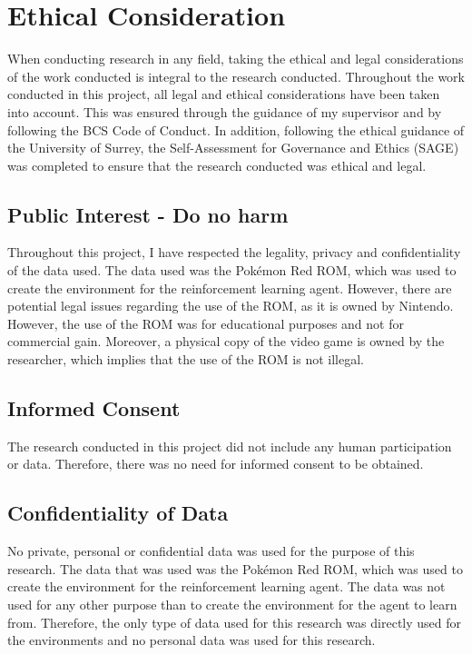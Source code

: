 \section{Ethical Consideration}

When conducting research in any field, taking the ethical and legal considerations of the work conducted is integral to the research conducted. Throughout the work conducted in this project, all legal and ethical considerations have been taken into account. This was ensured through the guidance of my supervisor and by following the BCS Code of Conduct. In addition, following the ethical guidance of the University of Surrey, the Self-Assessment for Governance and Ethics (SAGE) was completed to ensure that the research conducted was ethical and legal.


\subsection{Public Interest - Do no harm}

Throughout this project, I have respected the legality, privacy and confidentiality of the data used. The data used was the Pokémon Red ROM, which was used to create the environment for the reinforcement learning agent. However, there are potential legal issues regarding the use of the ROM, as it is owned by Nintendo. However, the use of the ROM was for educational purposes and not for commercial gain. Moreover, a physical copy of the video game is owned by the researcher, which implies that the use of the ROM is not illegal.

\subsection{Informed Consent}

The research conducted in this project did not include any human participation or data. Therefore, there was no need for informed consent to be obtained.

\subsection{Confidentiality of Data}

No private, personal or confidential data was used for the purpose of this research. The data that was used was the Pokémon Red ROM, which was used to create the environment for the reinforcement learning agent. The data was not used for any other purpose than to create the environment for the agent to learn from. Therefore, the only type of data used for this research was directly used for the environments and no personal data was used for this research.

